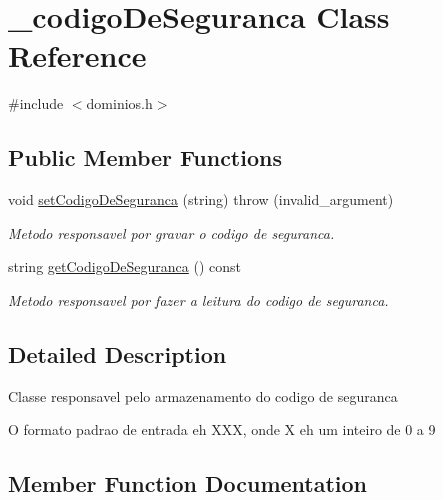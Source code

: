 \hypertarget{class__codigo_de_seguranca}{}\section{\+\_\+codigo\+De\+Seguranca Class Reference}
\label{class__codigo_de_seguranca}


{\ttfamily \#include $<$dominios.\+h$>$}

\subsection*{Public Member Functions}
\begin{DoxyCompactItemize}
\item 
void \mbox{\hyperlink{class__codigo_de_seguranca_a4c926ed3d3b4153c543431d917b2e9cd}{set\+Codigo\+De\+Seguranca}} (string)  throw (invalid\+\_\+argument)
\begin{DoxyCompactList}\small\item\em Metodo responsavel por gravar o codigo de seguranca. \end{DoxyCompactList}\item 
string \mbox{\hyperlink{class__codigo_de_seguranca_a1f82e94e21379adaa7d232636db51b96}{get\+Codigo\+De\+Seguranca}} () const
\begin{DoxyCompactList}\small\item\em Metodo responsavel por fazer a leitura do codigo de seguranca. \end{DoxyCompactList}\end{DoxyCompactItemize}


\subsection{Detailed Description}
Classe responsavel pelo armazenamento do codigo de seguranca

O formato padrao de entrada eh X\+XX, onde X eh um inteiro de 0 a 9 

\subsection{Member Function Documentation}
\mbox{\label{class__codigo_de_seguranca_a1f82e94e21379adaa7d232636db51b96}} 
